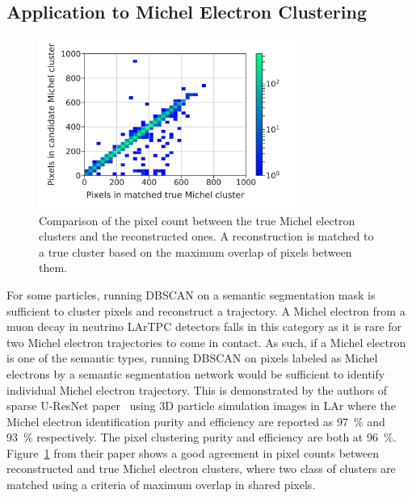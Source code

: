 \documentclass{ws-rv9x6}
\begin{document}
\subsection{Application to Michel Electron Clustering}
\begin{figure}[t]
    \centering
    \includegraphics[width=0.75\textwidth]{figures/num_true_pix_vs_num_pred_pix3_new.pdf}
    \caption{Comparison of the pixel count between the true Michel electron clusters and the reconstructed ones. A reconstruction is matched to a true cluster based on the maximum overlap of pixels between them.}
    \label{fig:clustering:michel}
\end{figure}
For some particles, running DBSCAN on a semantic segmentation mask is sufficient to cluster pixels and reconstruct a trajectory. A Michel electron from a muon decay in neutrino LArTPC detectors falls in this category as it is rare for two Michel electron trajectories to come in contact. As such, if a Michel electron is one of the semantic types, running DBSCAN on pixels labeled as Michel electrons by a semantic segmentation network would be sufficient to identify individual Michel electron trajectory. This is demonstrated by the authors of sparse U-ResNet paper~\cite{domine_laura_2018_1300713} using  3D particle simulation images in LAr where the Michel electron identification purity and efficiency are reported as 97~\% and 93~\% respectively. The pixel clustering purity and efficiency are both at 96~\%. Figure~\ref{fig:clustering:michel} from their paper shows a good agreement in pixel counts between reconstructed and true Michel electron clusters, where two class of clusters are matched using a criteria of maximum overlap in shared pixels.
\end{document}
